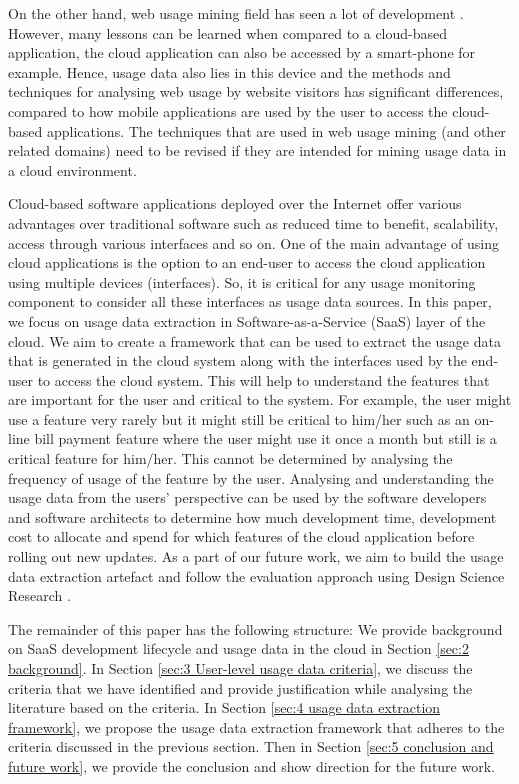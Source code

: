 \documentclass[a4paper,twoside]{article}
\begin{document}
On the other hand, web usage mining field has seen a lot of development \cite{Gasparetti2016ModelingActivities,Ghezzi2014MiningApplications}. However, many lessons can be learned when compared to a cloud-based application, the cloud application can also be accessed by a smart-phone for example. Hence, usage data also lies in this device and the methods and techniques for analysing web usage by website visitors has significant differences, compared to how mobile applications are used by the user to access the cloud-based applications. The techniques that are used in web usage mining (and other related domains) need to be revised if they are intended for mining usage data in a cloud environment.

Cloud-based software applications deployed over the Internet offer various advantages over traditional software such as reduced time to benefit, scalability, access through various interfaces and so on. One of the main advantage of using cloud applications is the option to an end-user to access the cloud application using multiple devices (interfaces). So, it is critical for any usage monitoring component to consider all these interfaces as usage data sources. In this paper, we focus on usage data extraction in Software-as-a-Service (SaaS) layer of the cloud. We aim to create a framework that can be used to extract the usage data that is generated in the cloud system along with the interfaces used by the end-user to access the cloud system. This will help to understand the features that are important for the user and critical to the system. For example, the user might use a feature very rarely but it might still be critical to him/her such as an on-line bill payment feature where the user might use it once a month but still is a critical feature for him/her. This cannot be determined by analysing the frequency of usage of the feature by the user. Analysing and understanding the usage data from the users’ perspective can be used by the software developers and software architects to determine how much development time, development cost to allocate and spend for which features of the cloud application before rolling out new updates. As a part of our future work, we aim to build the usage data extraction artefact and follow the evaluation approach using Design Science Research \cite{Helfert2012TheFramework}.

The remainder of this paper has the following structure: We provide background on SaaS development lifecycle and usage data in the cloud in Section \ref{sec:2 background}. In Section \ref{sec:3 User-level usage data criteria}, we discuss the criteria that we have identified and provide justification while analysing the literature based on the criteria. In Section \ref{sec:4 usage data extraction framework}, we propose the usage data extraction framework that adheres to the criteria discussed in the previous section. Then in Section \ref{sec:5 conclusion and future work}, we provide the conclusion and show direction for the future work.
\end{document}
